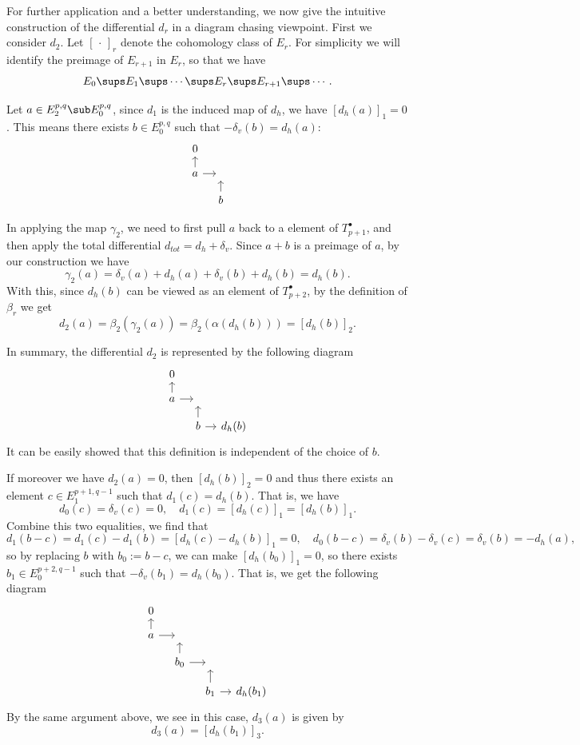 \begin{remark}
For further application and a better understanding, we now give the intuitive construction of the differential $d_r$ in a diagram chasing viewpoint. First we consider 
$d_2$. Let $[\,\cdot\,]_r$ denote the cohomology class of $E_r$. For simplicity we will identify the preimage of $E_{r+1}$ in $E_r$, so that we have 
\[E_0\sups E_1\sups\cdots\sups E_r\sups E_{r+1}\sups\cdots.\]

Let $a\in E_2^{p,q}\sub E_0^{p,q}$, since $d_1$ is the induced map of $d_h$, we have $[d_h(a)]_1=0$. This means there exists $b\in E_0^{p,q}$ such that $-\delta_v(b)=d_h(a)$:
\[\begin{tikzcd}[column sep=1.0 em,row sep=1.0 em]
0&\\
a\ar[u]\ar[r]&{}\\
{}&b\ar[u]
\end{tikzcd}\]

In applying the map $\gamma_2$, we need to first pull $a$ back to a element of $T_{p+1}^\bullet$, and then apply the total differential 
$d_{tot}=d_h+\delta_v$. Since $a+b$ is a preimage of $a$, by our construction we have
\[\gamma_2(a)=\delta_v(a)+d_h(a)+\delta_v(b)+d_h(b)=d_h(b).\]
With this, since $d_h(b)$ can be viewed as an element of $T^\bullet_{p+2}$, by the definition of $\beta_r$ we get
\[d_2(a)=\beta_2(\gamma_2(a))=\beta_2(\alpha(d_h(b)))=[d_h(b)]_2.\]

In summary, the differential $d_2$ is represented by the following diagram
\[\begin{tikzcd}[column sep=1.0 em,row sep=1.0 em]
0&&\\
a\ar[u]\ar[r]&{}&{}\\
{}&b\ar[u]\ar[r]&d_h(b)
\end{tikzcd}\]
It can be easily showed that this definition is independent of the choice of $b$.\par
If moreover we have $d_2(a)=0$, then $[d_h(b)]_2=0$ and thus there exists an element $c\in E_1^{p+1,q-1}$ such that $d_1(c)=d_h(b)$. That is, we have
\[d_0(c)=\delta_v(c)=0,\quad d_1(c)=[d_h(c)]_1=[d_h(b)]_1.\] 
Combine this two equalities, we find that
\[d_1(b-c)=d_1(c)-d_1(b)=[d_h(c)-d_h(b)]_1=0,\quad d_0(b-c)=\delta_v(b)-\delta_v(c)=\delta_v(b)=-d_h(a),\]
so by replacing $b$ with $b_0:=b-c$, we can make $[d_h(b_0)]_1=0$, so there exists $b_1\in E_0^{p+2,q-1}$ such that $-\delta_v(b_1)=d_h(b_0)$. That is, we get the following diagram
\[\begin{tikzcd}[column sep=1.0 em,row sep=1.0 em]
0&&&\\
a\ar[u]\ar[r]&{}&{}&\\
{}&b_0\ar[u]\ar[r]&{}&\\
{}&{}&b_1\ar[u]\ar[r]&d_h(b_1)
\end{tikzcd}\]
By the same argument above, we see in this case, $d_3(a)$ is given by
\[d_3(a)=[d_h(b_1)]_3.\]


\end{remark}
